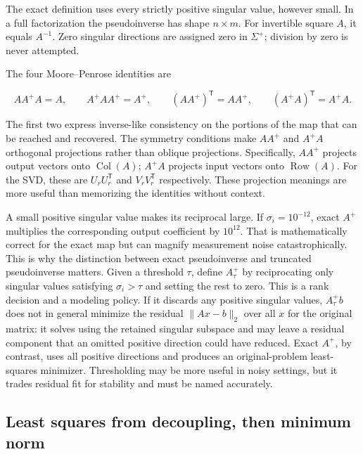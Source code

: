 The exact definition uses every strictly positive singular value, however small. In a full factorization the pseudoinverse has shape \(n\times m\). For invertible square \(A\), it equals \(A^{-1}\). Zero singular directions are assigned zero in \(\Sigma^+\); division by zero is never attempted.

The four Moore--Penrose identities are

\[
AA^+A=A,\qquad A^+AA^+=A^+,\qquad (AA^+)^\mathsf T=AA^+,\qquad (A^+A)^\mathsf T=A^+A.
\]

The first two express inverse-like consistency on the portions of the map that can be reached and recovered. The symmetry conditions make \(AA^+\) and \(A^+A\) orthogonal projections rather than oblique projections. Specifically, \(AA^+\) projects output vectors onto \(\operatorname{Col}(A)\); \(A^+A\) projects input vectors onto \(\operatorname{Row}(A)\). For the SVD, these are \(U_rU_r^\mathsf T\) and \(V_rV_r^\mathsf T\) respectively. These projection meanings are more useful than memorizing the identities without context.

A small positive singular value makes its reciprocal large. If \(\sigma_i=10^{-12}\), exact \(A^+\) multiplies the corresponding output coefficient by \(10^{12}\). That is mathematically correct for the exact map but can magnify measurement noise catastrophically. This is why the distinction between exact pseudoinverse and truncated pseudoinverse matters. Given a threshold \(\tau\), define \(A_\tau^+\) by reciprocating only singular values satisfying \(\sigma_i>\tau\) and setting the rest to zero. This is a rank decision and a modeling policy. If it discards any positive singular values, \(A_\tau^+b\) does not in general minimize the residual \(\|Ax-b\|_2\) over all \(x\) for the original matrix: it solves using the retained singular subspace and may leave a residual component that an omitted positive direction could have reduced. Exact \(A^+\), by contrast, uses all positive directions and produces an original-problem least-squares minimizer. Thresholding may be more useful in noisy settings, but it trades residual fit for stability and must be named accurately.

\subsection{Least squares from decoupling, then minimum norm}\label{02-foundations-ii-ch024-least-squares-from-decoupling-then-minimum-norm}

\hypertarget{02-foundations-ii-ch024-least-squares-from-decoupling-then-minimum-norm}{}


